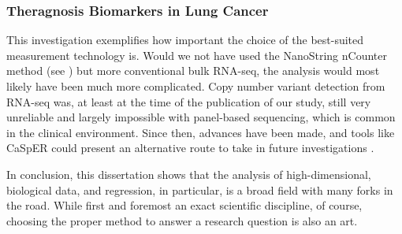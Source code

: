 \subsubsection{Theragnosis Biomarkers in Lung Cancer}
\label{subsubsec:alk}

This investigation exemplifies how important the choice of the best-suited
measurement technology is. Would we not have used the NanoString nCounter
method (see ) but more conventional bulk RNA-seq, the
analysis would most likely have been much more complicated. Copy number
variant detection from RNA-seq was, at least at the time of the publication of
our study, still very unreliable and largely impossible with panel-based
sequencing, which is common in the clinical environment. Since then, advances
have been made, and tools like CaSpER could present an alternative route to
take in future investigations \citep{SerinHarmanci2020}.
\bigbreak

\noindent 
In conclusion, this dissertation shows that the analysis of high-dimensional,
biological data, and regression, in particular, is a broad field with many
forks in the road. While first and foremost an exact scientific discipline, of
course, choosing the proper method to answer a research question is also an art.
